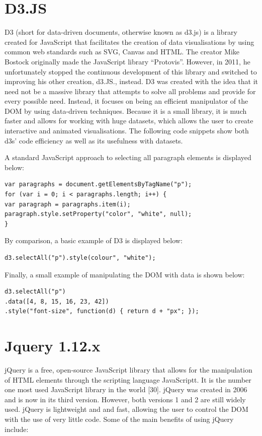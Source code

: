 \section{D3.JS}
D3 (short for data-driven documents, otherwise known as d3.js) is a library created for JavaScript that facilitates the creation of data visualisations by using common web standards such as SVG, Canvas and HTML. The creator Mike Bostock originally made the JavaScript library “Protovis”. 
However, in 2011, he unfortunately stopped the continuous development of this library and switched to improving his other creation, d3.JS., instead. D3 was created with the idea that it need not be a massive library that attempts to solve all problems and provide for every possible need. Instead, it focuses on being an efficient manipulator of the DOM by using data-driven techniques. Because it is a small library, it is much faster and allows for working with huge datasets, which allows the user to create interactive and animated visualisations.  The following code snippets show both d3s’ code efficiency as well as its usefulness with datasets. 

A standard JavaScript approach to selecting all paragraph elements is displayed below:
\begin{verbatim}
var paragraphs = document.getElementsByTagName("p");
for (var i = 0; i < paragraphs.length; i++) {
var paragraph = paragraphs.item(i);
paragraph.style.setProperty("color", "white", null);
}
\end{verbatim}
By comparison, a basic example of D3 is displayed below: 
\begin{verbatim}
d3.selectAll("p").style(colour", "white");
\end{verbatim}
Finally, a small example of manipulating the DOM with data is shown below:
\begin{verbatim}
d3.selectAll("p")
.data([4, 8, 15, 16, 23, 42])
.style("font-size", function(d) { return d + "px"; });
\end{verbatim}
\section{Jquery 1.12.x}
jQuery is a free, open-source JavaScript library that allows for the manipulation of HTML elements through the scripting language JavaScriptt. It is the number one most used JavaScript library in the world [30]. jQuery was created in 2006 and is now in its third version. However, both versions 1 and 2 are still widely used. jQuery is lightweight and and fast, allowing the user to control the DOM with the use of very little code. Some of the main benefits of using jQuery include:

